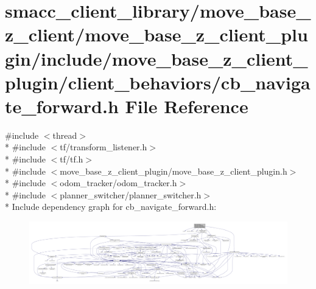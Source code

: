 \hypertarget{smacc__client__library_2move__base__z__client_2move__base__z__client__plugin_2include_2move__bas3f31d4d52bbf09e30133b849422d4b0f}{}\section{smacc\+\_\+client\+\_\+library/move\+\_\+base\+\_\+z\+\_\+client/move\+\_\+base\+\_\+z\+\_\+client\+\_\+plugin/include/move\+\_\+base\+\_\+z\+\_\+client\+\_\+plugin/client\+\_\+behaviors/cb\+\_\+navigate\+\_\+forward.h File Reference}
\label{smacc__client__library_2move__base__z__client_2move__base__z__client__plugin_2include_2move__bas3f31d4d52bbf09e30133b849422d4b0f}
{\ttfamily \#include $<$thread$>$}\\*
{\ttfamily \#include $<$tf/transform\+\_\+listener.\+h$>$}\\*
{\ttfamily \#include $<$tf/tf.\+h$>$}\\*
{\ttfamily \#include $<$move\+\_\+base\+\_\+z\+\_\+client\+\_\+plugin/move\+\_\+base\+\_\+z\+\_\+client\+\_\+plugin.\+h$>$}\\*
{\ttfamily \#include $<$odom\+\_\+tracker/odom\+\_\+tracker.\+h$>$}\\*
{\ttfamily \#include $<$planner\+\_\+switcher/planner\+\_\+switcher.\+h$>$}\\*
Include dependency graph for cb\+\_\+navigate\+\_\+forward.\+h\+:
\nopagebreak
\begin{figure}[H]
\begin{center}
\leavevmode
\includegraphics[width=350pt]{smacc__client__library_2move__base__z__client_2move__base__z__client__plugin_2include_2move__bas26aeba7a014e4b6e7867fee48867bf77}
\end{center}
\end{figure}
